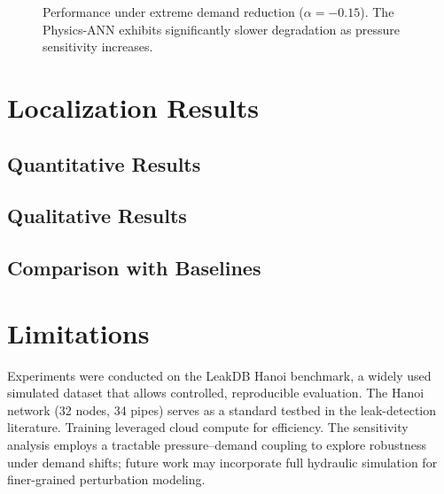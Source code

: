 \documentclass[final,5p,times,twocolumn,authoryear]{elsarticle}
\begin{document}
\begin{figure}[H]
\centering
{}
\caption{Performance under extreme demand reduction ($\alpha=-0.15$). The Physics-ANN exhibits significantly slower degradation as pressure sensitivity increases.}
\end{figure}



\section{Localization Results}

\subsection{Quantitative Results}

\subsection{Qualitative Results}

\subsection{Comparison with Baselines}

\section{Limitations}
Experiments were conducted on the LeakDB Hanoi benchmark, a widely used simulated dataset that allows controlled, reproducible evaluation. The Hanoi network (32 nodes, 34 pipes) serves as a standard testbed in the leak-detection literature. Training leveraged cloud compute for efficiency. The sensitivity analysis employs a tractable pressure–demand coupling to explore robustness under demand shifts; future work may incorporate full hydraulic simulation for finer-grained perturbation modeling.
\end{document}

